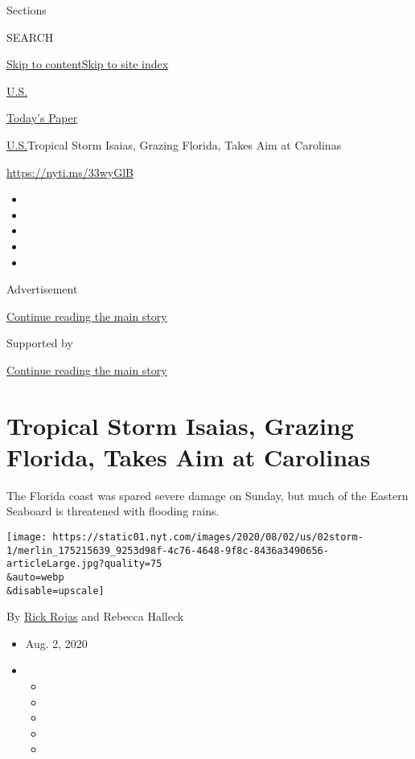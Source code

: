 Sections

SEARCH

\protect\hyperlink{site-content}{Skip to
content}\protect\hyperlink{site-index}{Skip to site index}

\href{https://www.nytimes.com/section/us}{U.S.}

\href{https://myaccount.nytimes.com/auth/login?response_type=cookie\&client_id=vi}{}

\href{https://www.nytimes.com/section/todayspaper}{Today's Paper}

\href{/section/us}{U.S.}\textbar{}Tropical Storm Isaias, Grazing
Florida, Takes Aim at Carolinas

\url{https://nyti.ms/33wyGlB}

\begin{itemize}
\item
\item
\item
\item
\item
\end{itemize}

Advertisement

\protect\hyperlink{after-top}{Continue reading the main story}

Supported by

\protect\hyperlink{after-sponsor}{Continue reading the main story}

\hypertarget{tropical-storm-isaias-grazing-florida-takes-aim-at-carolinas}{%
\section{Tropical Storm Isaias, Grazing Florida, Takes Aim at
Carolinas}\label{tropical-storm-isaias-grazing-florida-takes-aim-at-carolinas}}

The Florida coast was spared severe damage on Sunday, but much of the
Eastern Seaboard is threatened with flooding rains.

\texttt{[image: https://static01.nyt.com/images/2020/08/02/us/02storm-1/merlin\_175215639\_9253d98f-4c76-4648-9f8c-8436a3490656-articleLarge.jpg?quality=75\\\&auto=webp\\\&disable=upscale]}

By \href{https://www.nytimes.com/by/rick-rojas}{Rick Rojas} and Rebecca
Halleck

\begin{itemize}
\item
  Aug. 2, 2020
\item
  \begin{itemize}
  \item
  \item
  \item
  \item
  \item
  \end{itemize}
\end{itemize}


